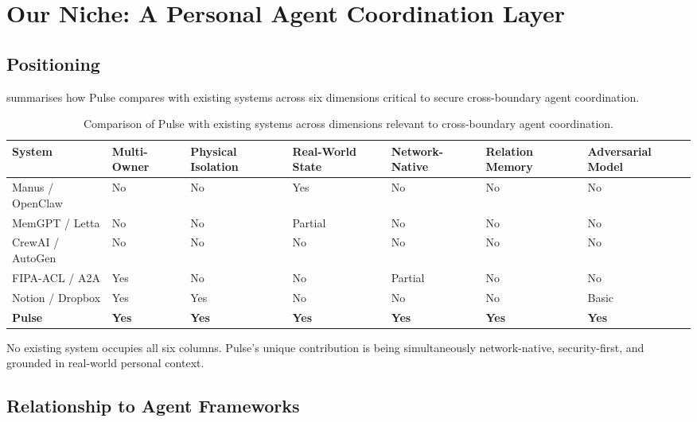 \section{Our Niche: A Personal Agent Coordination Layer}
\label{sec:rw_niche}

\subsection{Positioning}

 summarises how Pulse compares with existing systems across six dimensions critical to secure cross-boundary agent coordination.

\begin{table}[h]
\centering
\caption{Comparison of Pulse with existing systems across dimensions relevant to cross-boundary agent coordination.}
\label{table:comparison}
\begin{tabular}{p{2.8cm} p{1.5cm} p{1.5cm} p{1.5cm} p{1.5cm} p{1.5cm} p{1.5cm}}
\toprule
\textbf{System} & \textbf{Multi-Owner} & \textbf{Physical Isolation} & \textbf{Real-World State} & \textbf{Network-Native} & \textbf{Relation Memory} & \textbf{Adversarial Model} \\
\midrule
Manus / OpenClaw  & No  & No  & Yes & No      & No  & No \\
MemGPT / Letta    & No  & No  & Partial & No  & No  & No \\
CrewAI / AutoGen  & No  & No  & No  & No      & No  & No \\
FIPA-ACL / A2A    & Yes & No  & No  & Partial & No  & No \\
Notion / Dropbox  & Yes & Yes & No  & No      & No  & Basic \\
\textbf{Pulse}    & \textbf{Yes} & \textbf{Yes} & \textbf{Yes} & \textbf{Yes} & \textbf{Yes} & \textbf{Yes} \\
\bottomrule
\end{tabular}
\end{table}

No existing system occupies all six columns. Pulse's unique contribution is being simultaneously network-native, security-first, and grounded in real-world personal context.

\subsection{Relationship to Agent Frameworks}

